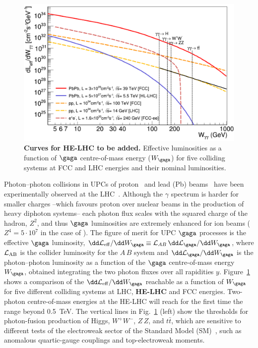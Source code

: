 \documentclass[../report.tex]{subfiles}
\begin{document}
\begin{figure}[!t]
\centering
\includegraphics[width=0.52\columnwidth]{helhc/figs/lumi_gammagamma_fcc_ions.pdf}
\caption{{\bf Curves for HE-LHC to be added.} Effective luminosities as a function of $\gaga$ centre-of-mass energy ($W_{\gaga}$) for five
  colliding systems at FCC and LHC energies and their nominal
  luminosities.}
\label{fig:gamgam_lumi}
\end{figure}


Photon--photon collisions in UPCs of proton~\cite{d'Enterria:2008sh} 
and lead (Pb) beams~\cite{Baltz:2007kq} have been experimentally observed at the
LHC~\cite{Chatrchyan:2012tv,Chatrchyan:2013foa,Abbas:2013oua,Aad:2015bwa}.
Although the $\gamma$ spectrum is harder for smaller charges --which favours proton over nuclear beams in the
production of heavy diphoton systems-- each photon flux scales with the squared charge of the hadron, $Z^2$, and
thus $\gaga$ luminosities are extremely enhanced for ion beams
($Z^4=5\cdot 10^{7}$ in the case of
\PbPb). 
The figure of merit for UPC $\gaga$ processes is the effective $\gaga$ luminosity, 
$\dd\mathcal{L}_{\rm eff}/\dd W_{\gaga} \equiv
\mathcal{L}_{AB}\,\dd\mathcal{L}_{\gaga}/\dd W_{\gaga}$, where ${\cal L}_{\rm AB}$ is the
collider luminosity for the $A$\,$B$ system and
$\dd\mathcal{L}_{\gaga}/\dd W_{\gaga}$ is the photon--photon luminosity
as a function of the $\gaga$ centre-of-mass energy $W_{\gaga}$, obtained integrating the two photon fluxes over all
rapidities $y$.
Figure~\ref{fig:gamgam_lumi} shows a comparison of the $\dd\mathcal{L}_{\rm eff}/\dd W_{\gaga}$ reachable as a
function of $W_{\gaga}$ for five different colliding systems at LHC,
{\bf HE-LHC} and FCC energies. Two-photon centre-of-mass
energies at the HE-LHC will reach for the first time the range beyond 0.5~TeV. 
The
vertical lines in Fig.~\ref{fig:gamgam_lumi} (left) show the thresholds for photon-fusion production of Higgs,
$W^+W^-$, $Z\,Z$, and $t\bar t$, which are sensitive to different tests of the electroweak sector of
the Standard Model (SM)~\cite{dEnterria:2017qte}, such as anomalous quartic-gauge couplings and top-electroweak
moments.
\end{document}
